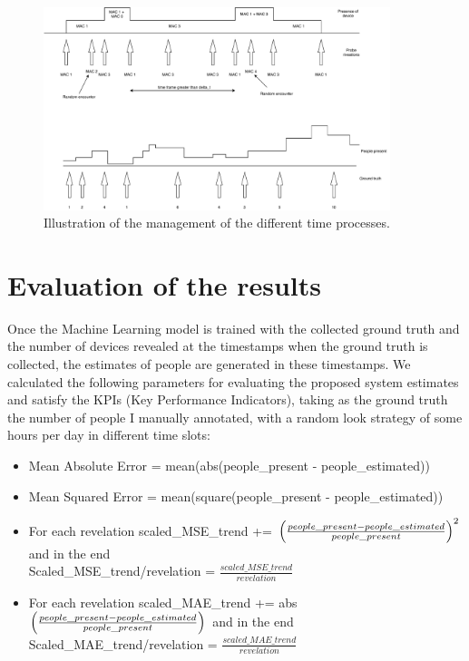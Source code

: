 \begin{figure}[h]
\centering 
\includegraphics[width=0.9\textwidth]{images/timeprocesses} 
\caption{Illustration of the management of the different time processes.}
\label{fig:timeprocesses}
\end{figure}


\section{Evaluation of the results}
\label{sec:evalres}
\vspace{0.2 cm} 

Once the Machine Learning model is trained with the collected ground truth and the number of devices revealed at the timestamps when the ground truth is collected, the estimates of people are generated in these timestamps. We calculated the following parameters for evaluating the proposed system estimates and satisfy the KPIs (Key Performance Indicators), taking as the ground truth the number of people I manually annotated, with a random look strategy of some hours per day in different time slots:
\begin{itemize}
  \item Mean Absolute Error = mean(abs(people\_present - people\_estimated))
  \item Mean Squared Error = mean(square(people\_present - people\_estimated))
  \item For each revelation scaled\_MSE\_trend += $\Bigl(\frac{people\_present - people\_estimated}{people\_present} \Bigr)^{2}$ and in the end\\Scaled\_MSE\_trend/revelation = $\frac{scaled\_MSE\_trend}{revelation}$
  \item For each revelation scaled\_MAE\_trend += abs$\Bigl(\frac{people\_present - people\_estimated}{people\_present} \Bigr)$ and in the end\\Scaled\_MAE\_trend/revelation = $\frac{scaled\_MAE\_trend}{revelation}$
\end{itemize}

